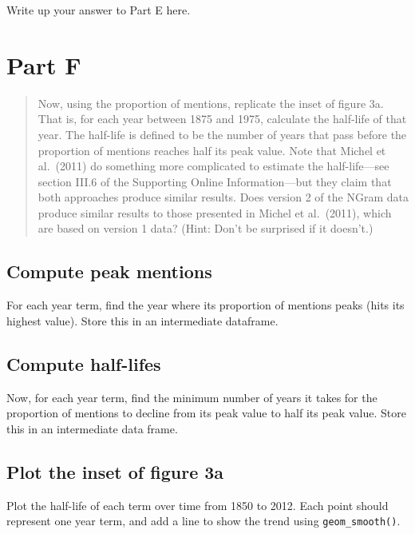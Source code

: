 \documentclass[
]{article}
\begin{document}
Write up your answer to Part E here.

\hypertarget{part-f}{%
\section{Part F}\label{part-f}}

\begin{quote}
Now, using the proportion of mentions, replicate the inset of figure 3a.
That is, for each year between 1875 and 1975, calculate the half-life of
that year. The half-life is defined to be the number of years that pass
before the proportion of mentions reaches half its peak value. Note that
Michel et al.~(2011) do something more complicated to estimate the
half-life---see section III.6 of the Supporting Online Information---but
they claim that both approaches produce similar results. Does version 2
of the NGram data produce similar results to those presented in Michel
et al.~(2011), which are based on version 1 data? (Hint: Don't be
surprised if it doesn't.)
\end{quote}

\hypertarget{compute-peak-mentions}{%
\subsection{Compute peak mentions}\label{compute-peak-mentions}}

For each year term, find the year where its proportion of mentions peaks
(hits its highest value). Store this in an intermediate dataframe.

\hypertarget{compute-half-lifes}{%
\subsection{Compute half-lifes}\label{compute-half-lifes}}

Now, for each year term, find the minimum number of years it takes for
the proportion of mentions to decline from its peak value to half its
peak value. Store this in an intermediate data frame.

\hypertarget{plot-the-inset-of-figure-3a}{%
\subsection{Plot the inset of figure
3a}\label{plot-the-inset-of-figure-3a}}

Plot the half-life of each term over time from 1850 to 2012. Each point
should represent one year term, and add a line to show the trend using
\texttt{geom\_smooth()}.
\end{document}
